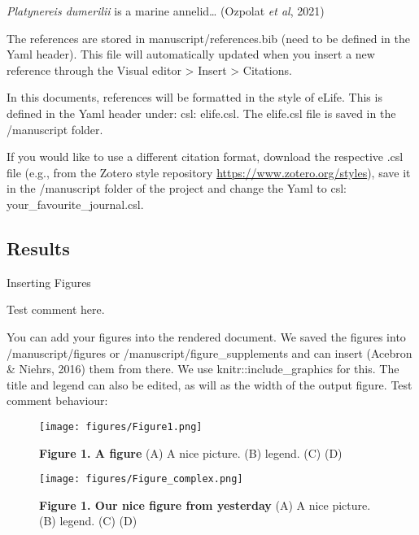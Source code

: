 \documentclass[
  11pt,
]{article}
\begin{document}
\emph{Platynereis dumerilii} is a marine annelid\ldots{} (Ozpolat
\emph{et al}, 2021)

The references are stored in manuscript/references.bib (need to be
defined in the Yaml header). This file will automatically updated when
you insert a new reference through the Visual editor \textgreater{}
Insert \textgreater{} Citations.

In this documents, references will be formatted in the style of eLife.
This is defined in the Yaml header under: csl: elife.csl. The elife.csl
file is saved in the /manuscript folder.

If you would like to use a different citation format, download the
respective .csl file (e.g., from the Zotero style repository
\url{https://www.zotero.org/styles}), save it in the /manuscript folder
of the project and change the Yaml to csl: your\_favourite\_journal.csl.

\subsection{Results}\label{results}

Inserting Figures

Test comment here.

You can add your figures into the rendered document. We saved the
figures into /manuscript/figures or /manuscript/figure\_supplements and
can insert (Acebron \& Niehrs, 2016) them from there. We use
knitr::include\_graphics for this. The title and legend can also be
edited, as will as the width of the output figure. Test comment
behaviour:

\begin{figure}[H]

{\centering \texttt{[image: figures/Figure1.png]}

}

\caption{\textbf{Figure 1. A figure} (A) A nice picture. (B) legend. (C)
(D)}

\end{figure}%

\begin{figure}[H]

{\centering \texttt{[image: figures/Figure\_complex.png]}

}

\caption{\textbf{Figure 1. Our nice figure from yesterday} (A) A nice
picture. (B) legend. (C) (D)}

\end{figure}%
\end{document}
